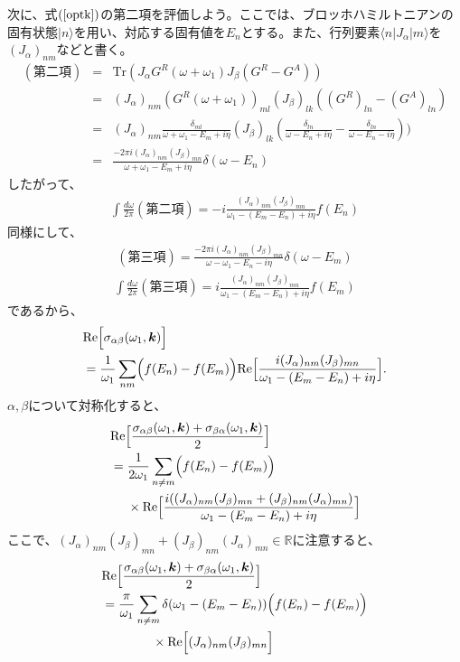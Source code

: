 \documentclass[12pt]{jsbook}
\newcommand{\la}{\langle}
\newcommand{\ra}{\rangle}
\newcommand{\R}{\mathbb{R}}
\newcommand{\ReB}[1]{\mathrm{Re}\Bigl[{#1}\Bigr]}
\newcommand{\bk}{\bm{k}}
\begin{document}
次に、式$(\ref{optk})$の第二項を評価しよう。ここでは、ブロッホハミルトニアンの固有状態$|n\ra$を用い、対応する固有値を$E_n$とする。また、行列要素$\la n| J_\alpha|m\ra$を$(J_\alpha)_{nm}$などと書く。
\begin{eqnarray}
(第二項)
&=& \mathrm{Tr}(J_\alpha G^R(\omega+\omega_1)J_\beta (G^R-G^A))\\
         &=& (J_\alpha)_{nm}(G^R(\omega+\omega_1))_{ml}(J_\beta)_{lk}((G^R)_{ln}-(G^A)_{ln})\\
         &=& (J_\alpha)_{nm}\frac{\delta_{ml}}{\omega + \omega_1 - E_m + i\eta}(J_\beta)_{lk}(\frac{\delta_{ln}}{\omega - E_n + i\eta}-\frac{\delta_{ln}}{\omega - E_n - i\eta}))\\
         &=&\frac{-2\pi i (J_\alpha)_{nm}(J_\beta)_{mn}}{\omega + \omega_1 -E_m + i\eta}\delta(\omega - E_n)
\end{eqnarray}
したがって、
\begin{eqnarray}
\int \frac{d\omega}{2\pi}(第二項) = -i\frac{(J_\alpha)_{nm}(J_\beta)_{mn}}{\omega_1-(E_m-E_n)+i\eta}f(E_n)
\end{eqnarray}
同様にして、
\begin{eqnarray}
(第三項) = \frac{-2\pi i (J_\alpha)_{nm}(J_\beta)_{mn}}{\omega - \omega_1 -E_n - i\eta}\delta(\omega - E_m)
\end{eqnarray}
\begin{eqnarray}
\int \frac{d\omega}{2\pi}(第三項) = i\frac{(J_\alpha)_{nm}(J_\beta)_{mn}}{\omega_1-(E_m-E_n)+i\eta}f(E_m)
\end{eqnarray}
であるから、
\begin{align}
&\ReB{\sigma_{\alpha\beta}(\omega_1,\bk)}\nonumber\\
&=  \frac{1}{\omega_1}\sum_{nm}\Bigl(f(E_n)-f(E_m)\Bigr)\mathrm{Re}\Bigl[\frac{i(J_\alpha)_{nm}(J_\beta)_{mn}}{\omega_1-(E_m-E_n) + i\eta}\Bigr].
\end{align}
$\alpha,\beta$について対称化すると、
\begin{align}
&\ReB{\frac{\sigma_{\alpha\beta}(\omega_1,\bk) + \sigma_{\beta \alpha}(\omega_1,\bk)}{2}}\nonumber\\
&= \frac{1}{2\omega_1}\sum_{n\neq m}\Bigl(f(E_n)-f(E_m)\Bigr)\nonumber\\
& \ \ \ \ \times\mathrm{Re}\Bigl[\frac{i((J_\alpha)_{nm}(J_\beta)_{mn}+(J_\beta )_{nm}(J_\alpha)_{mn})}{\omega_1-(E_m-E_n) + i\eta}\Bigr]
\end{align}
ここで、$(J_\alpha)_{nm}(J_\beta)_{mn}+(J_\beta )_{nm}(J_\alpha)_{mn}\in \R$に注意すると、
\begin{align}
&\ReB{\frac{\sigma_{\alpha\beta}(\omega_1,\bk) + \sigma_{\beta \alpha}(\omega_1,\bk)}{2}}\nonumber\\
&=\frac{\pi }{\omega_1}\sum_{n\neq m} \delta(\omega_1-(E_m-E_n))\Bigl(f(E_n)-f(E_m)\Bigr)\nonumber\\
& \ \ \ \ \ \ \ \ \ \ \ \ \label{fnfm}\times\ReB{(J_\alpha)_{nm}(J_\beta)_{mn}}
\end{align}
\end{document}
